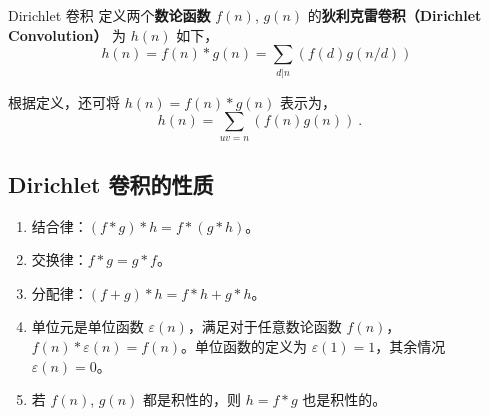 
\begin{definition}{Dirichlet 卷积}
定义两个\textbf{数论函数} $f(n)$, $g(n)$ 的\textbf{狄利克雷卷积（Dirichlet Convolution）} 为 $h(n)$ 如下，
\begin{equation}
h(n) = f(n) * g(n) = \sum_{d|n}\left(f(d) g(n/d)\right) ~~
\end{equation}
\end{definition}
根据定义，还可将 $h(n) = f(n) * g(n)$ 表示为，
\begin{equation}
h(n) = \sum_{uv = n} (f(n) g(n)) ~.
\end{equation}

\subsection{Dirichlet 卷积的性质}
\begin{enumerate}
\item 结合律：$(f*g)*h = f*(g*h)$。
\item 交换律：$f*g = g*f$。
\item 分配律：$(f+g)*h = f*h + g*h$。
\item 单位元是单位函数 $\varepsilon(n)$，满足对于任意数论函数 $f(n)$，$f(n)*\varepsilon(n) = f(n)$。单位函数的定义为 $\varepsilon(1)=1$，其余情况 $\varepsilon(n) = 0$。
\item 若 $f(n)$, $g(n)$ 都是积性的，则 $h = f*g$ 也是积性的。
\end{enumerate}
